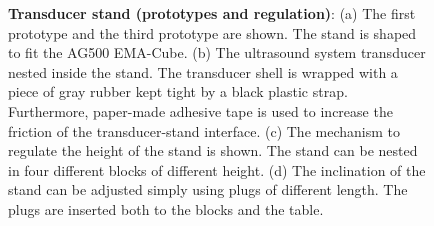 \begin{figure}
	\centering
		\hspace{0.05\textwidth}

		\hspace{0.05\textwidth}

	\caption[Transducer stand (prototypes and regulation)]{\textbf{Transducer stand (prototypes and regulation)}:
	(a) The first prototype and the third prototype are shown. 
	The stand is shaped to fit the AG500 EMA-Cube. 
	(b) The ultrasound system transducer nested inside the stand. The transducer
	shell is wrapped with a piece of gray rubber kept tight by a black plastic strap.
	Furthermore, paper-made adhesive tape is used to increase the friction of
	the transducer-stand interface.
	(c) The mechanism to regulate the height of the stand is shown. 
	The stand can be nested in four different blocks of different height.
	(d) The inclination of the stand can be adjusted simply using plugs of
	different length. The plugs are inserted both to the blocks and the table.
	}
	\label{fig:linguometer:od:stand}
\end{figure}
